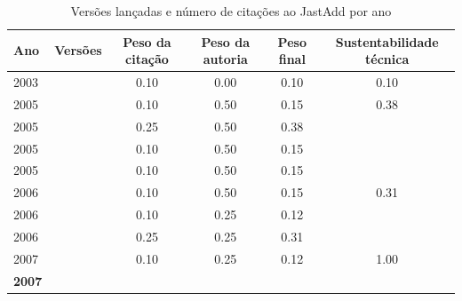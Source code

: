 \begin{table}[H]
\caption{Versões lançadas e número de citações ao JastAdd por ano}
\centering
\begin{tabular}{| l | c | c | c | c | c |}
  \hline
  Ano & Versões & Peso da citação & Peso da autoria & Peso final & Sustentabilidade técnica \\
  \hline
            2003
          &
          
          &
          0.10
          &
          0.00
          &
          0.10
          &
            {\color{red} 0.10}
          \\
\hline
            2005
          &
          
          &
          0.10
          &
          0.50
          &
          0.15
          &
            {\color{red} 0.38}
          \\
            2005
          &
          
          &
          0.25
          &
          0.50
          &
          0.38
          &
          \\
            2005
          &
          
          &
          0.10
          &
          0.50
          &
          0.15
          &
          \\
            2005
          &
          
          &
          0.10
          &
          0.50
          &
          0.15
          &
          \\
\hline
            2006
          &
          
          &
          0.10
          &
          0.50
          &
          0.15
          &
            {\color{red} 0.31}
          \\
            2006
          &
          
          &
          0.10
          &
          0.25
          &
          0.12
          &
          \\
            2006
          &
          
          &
          0.25
          &
          0.25
          &
          0.31
          &
          \\
\hline
            2007
          &
          
          &
          0.10
          &
          0.25
          &
          0.12
          &
            {\color{blue} 1.00}
          \\
            {\bf 2007}
          &
          

\end{tabular}
\end{table}
